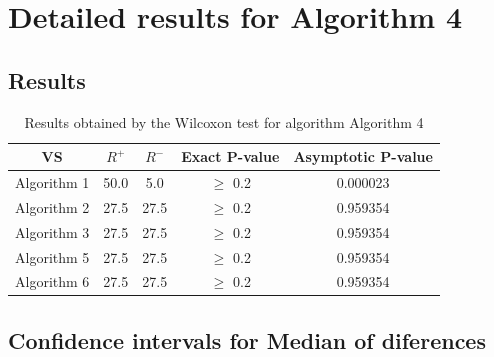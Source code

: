 \documentclass[a4paper,10pt]{article}
\begin{document}
 \clearpage 


\section{Detailed results for Algorithm 4}


\subsection{Results}

\begin{table}[!htp]
\centering\small
\begin{tabular}{
|c|c|c|c|c|}
\hline
 VS & $R^{+}$ & $R^{-}$ & Exact P-value & Asymptotic P-value \\ \hline 
Algorithm 1 & 50.0 & 5.0 & $\geq$ 0.2 & 0.000023\\ \hline 
Algorithm 2 & 27.5 & 27.5 & $\geq$ 0.2 & 0.959354\\ \hline 
Algorithm 3 & 27.5 & 27.5 & $\geq$ 0.2 & 0.959354\\ \hline 
Algorithm 5 & 27.5 & 27.5 & $\geq$ 0.2 & 0.959354\\ \hline 
Algorithm 6 & 27.5 & 27.5 & $\geq$ 0.2 & 0.959354\\ \hline 

\end{tabular}
\caption{Results obtained by the Wilcoxon test for algorithm Algorithm 4}
\end{table}

\subsection{Confidence intervals for Median of diferences}
\end{document}
